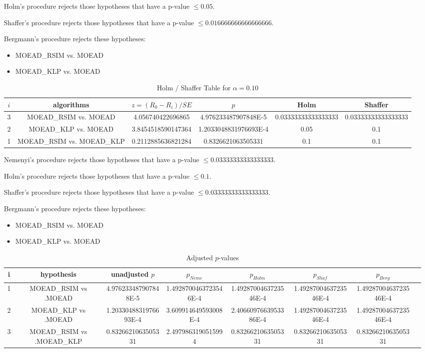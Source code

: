 \documentclass[a4paper,10pt]{article}
\begin{document}
\begin{landscape}
Holm's procedure rejects those hypotheses that have a p-value $\le0.05$.


Shaffer's procedure rejects those hypotheses that have a p-value $\le0.016666666666666666$.


Bergmann's procedure rejects these hypotheses:


\begin{itemize}


\item MOEAD_RSIM vs. MOEAD
\item MOEAD_KLP vs. MOEAD
\end{itemize}


\begin{table}[!htp]
\centering\tiny
\caption{Holm / Shaffer Table for $\alpha=0.10$}
\begin{tabular}{cccccc}
$i$&algorithms&$z=(R_0 - R_i)/SE$&$p$&Holm&Shaffer\\
\hline
3&MOEAD_RSIM vs. MOEAD&4.056740422696865&4.976233487907848E-5&0.03333333333333333&0.03333333333333333\\
2&MOEAD_KLP vs. MOEAD&3.8454518590147364&1.2033048831976693E-4&0.05&0.1\\
1&MOEAD_RSIM vs. MOEAD_KLP&0.2112885636821284&0.8326621063505331&0.1&0.1\\
\hline
\end{tabular}
\end{table}
Nemenyi's procedure rejects those hypotheses that have a p-value $\le0.03333333333333333$.


Holm's procedure rejects those hypotheses that have a p-value $\le0.1$.


Shaffer's procedure rejects those hypotheses that have a p-value $\le0.03333333333333333$.


Bergmann's procedure rejects these hypotheses:


\begin{itemize}


\item MOEAD_RSIM vs. MOEAD
\item MOEAD_KLP vs. MOEAD
\end{itemize}


\begin{table}[!htp]
\centering\tiny
\caption{Adjusted $p$-values}
\begin{tabular}{cccccccc}
i&hypothesis&unadjusted $p$&$p_{Neme}$&$p_{Holm}$&$p_{Shaf}$&$p_{Berg}$\\
\hline
1&MOEAD_RSIM vs .MOEAD&4.976233487907848E-5&1.4928700463723546E-4&1.4928700463723546E-4&1.4928700463723546E-4&1.4928700463723546E-4\\
2&MOEAD_KLP vs .MOEAD&1.2033048831976693E-4&3.609914649593008E-4&2.4066097663953386E-4&1.4928700463723546E-4&1.4928700463723546E-4\\
3&MOEAD_RSIM vs .MOEAD_KLP&0.8326621063505331&2.4979863190515994&0.8326621063505331&0.8326621063505331&0.8326621063505331\\
\hline
\end{tabular}
\end{table}

\end{landscape}
\end{document}
